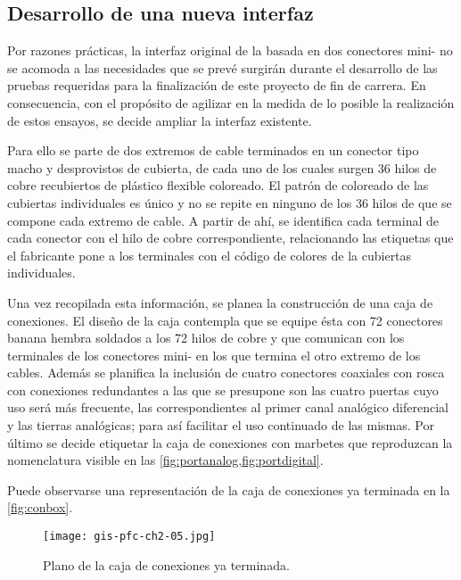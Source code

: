 \subsection{Desarrollo de una nueva interfaz}\label{subsec:conbox}

Por razones prácticas, la interfaz original de la \kpci{} basada en dos conectores mini- no se acomoda a las necesidades que se prevé surgirán durante el desarrollo de las pruebas requeridas para la finalización de este proyecto de fin de carrera. En consecuencia, con el propósito de agilizar en la medida de lo posible la realización de estos ensayos, se decide ampliar la interfaz existente.\par
Para ello se parte de dos extremos de cable terminados en un conector tipo macho y desprovistos de cubierta, de cada uno de los cuales surgen 36 hilos de cobre recubiertos de plástico flexible coloreado. El patrón de coloreado de las cubiertas individuales es único y no se repite en ninguno de los 36 hilos de que se compone cada extremo de cable. A partir de ahí, se identifica cada terminal de cada conector con el hilo de cobre correspondiente, relacionando las etiquetas que el fabricante pone a los terminales con el código de colores de la cubiertas individuales.\par
Una vez recopilada esta información, se planea la construcción de una caja de conexiones. El diseño de la caja contempla que se equipe ésta con 72 conectores banana hembra soldados a los 72 hilos de cobre y que comunican con los terminales de los conectores mini- en los que termina el otro extremo de los cables. Además se planifica la inclusión de cuatro conectores coaxiales con rosca con conexiones redundantes a las que se presupone son las cuatro puertas cuyo uso será más frecuente, las correspondientes al primer canal analógico diferencial y las tierras analógicas; para así facilitar el uso continuado de las mismas. Por último se decide etiquetar la caja de conexiones con marbetes que reproduzcan la nomenclatura visible en las \vref{fig:portanalog,fig:portdigital}.\par
Puede observarse una representación de la caja de conexiones ya terminada en la \vref{fig:conbox}.

\begin{figure}
	\begin{center}
		\texttt{[image: gis-pfc-ch2-05.jpg]}
	\end{center}
	\caption[Plano de la caja de conexiones ya terminada]{Plano de la caja de conexiones ya terminada.}
	\label{fig:conbox}
\end{figure}
